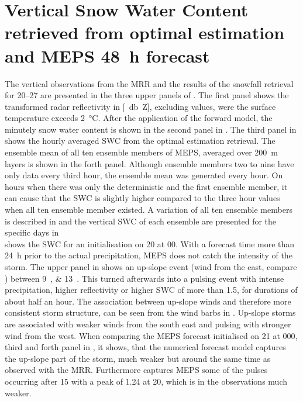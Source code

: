 
\section{Vertical Snow Water Content retrieved from optimal estimation and MEPS \SI{48}{\hour} forecast}
The vertical observations from the MRR and the results of the snowfall retrieval for \SIrange{20}{27}{\dec} are presented in the three upper panels of . The first panel shows the transformed radar reflectivity in [\SI{}{\decibel Z}], excluding values, were the surface temperature exceeds \SI{2}{\celsius}. After the application of the forward model, the minutely snow water content is shown in the second panel in . The third panel in  shows the hourly averaged SWC from the optimal estimation retrieval. The ensemble mean of all ten ensemble members of MEPS, averaged over \SI{200}{\metre} layers is shown in the forth panel. Although ensemble members two to nine have only data every third hour, the ensemble mean was generated every hour. On hours when there was only the deterministic and the first ensemble member, it can cause that the SWC is slightly higher compared to the three hour values when all ten ensemble member existed. A variation of all ten ensemble members is described in  and the vertical SWC of each ensemble are presented for the specific days in 
\\
 shows the SWC for an initialisation on \SI{20}{\dec} at 0\SI{0}{\UTC}. With a forecast time more than \SI{24}{\hour} prior to the actual precipitation, MEPS does not catch the intensity of the storm. The upper panel in  shows an up-slope event (wind from the east, compare ) between \SIlist{9;13}{\UTC}. This turned afterwards into a pulsing event with intense precipitation, higher reflectivity or higher SWC of more than \SI{1.5}{\SWC}, for durations of about half an hour. The association between up-slope winds and therefore more consistent storm structure, can be seen from the wind barbs in . Up-slope storms are associated with weaker winds from the south east and pulsing with stronger wind from the west. 
When comparing the MEPS forecast initialised on \SI{21}{\dec} at 0\SI{00}{\UTC}, third and forth panel in , it shows, that the numerical forecast model captures the up-slope part of the storm, much weaker but around the same time as observed with the MRR. Furthermore captures MEPS some of the pulses occurring after \SI{15}{\UTC} with a peak of \SI{1.24}{\SWC} at \SI{20}{\UTC}, which is in the observations much weaker. %

